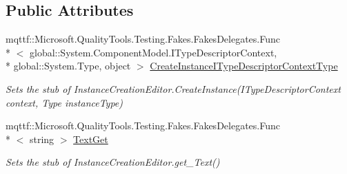 \subsection*{Public Attributes}
\begin{DoxyCompactItemize}
\item 
mqttf\-::\-Microsoft.\-Quality\-Tools.\-Testing.\-Fakes.\-Fakes\-Delegates.\-Func\\*
$<$ global\-::\-System.\-Component\-Model.\-I\-Type\-Descriptor\-Context, \\*
global\-::\-System.\-Type, object $>$ \hyperlink{class_system_1_1_component_model_1_1_fakes_1_1_stub_instance_creation_editor_a32b6ac18756c25e35871bce24707d354}{Create\-Instance\-I\-Type\-Descriptor\-Context\-Type}
\begin{DoxyCompactList}\small\item\em Sets the stub of Instance\-Creation\-Editor.\-Create\-Instance(\-I\-Type\-Descriptor\-Context context, Type instance\-Type)\end{DoxyCompactList}\item 
mqttf\-::\-Microsoft.\-Quality\-Tools.\-Testing.\-Fakes.\-Fakes\-Delegates.\-Func\\*
$<$ string $>$ \hyperlink{class_system_1_1_component_model_1_1_fakes_1_1_stub_instance_creation_editor_a5152a77595c77734d38708e121aae69e}{Text\-Get}
\begin{DoxyCompactList}\small\item\em Sets the stub of Instance\-Creation\-Editor.\-get\-\_\-\-Text()\end{DoxyCompactList}\end{DoxyCompactItemize}
